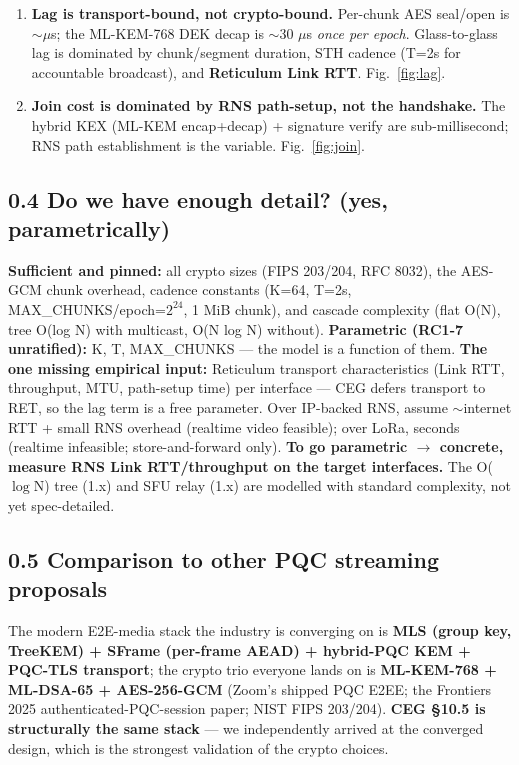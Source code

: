 \documentclass[10pt]{article}
\begin{document}
\begin{enumerate}
{both caught in review, both kept on record per the \S1.4 honesty discipline.)}
Fig.~\ref{fig:cascade}.
\item \textbf{Lag is transport-bound, not crypto-bound.} Per-chunk AES seal/open
is $\sim$$\mu$s; the ML-KEM-768 DEK decap is $\sim$30 $\mu$s \emph{once per epoch}.
Glass-to-glass lag is dominated by chunk/segment duration, STH cadence (T=2s for
accountable broadcast), and \textbf{Reticulum Link RTT}. Fig.~\ref{fig:lag}.
\item \textbf{Join cost is dominated by RNS path-setup, not the handshake.} The
hybrid KEX (ML-KEM encap+decap) + signature verify are sub-millisecond; RNS path
establishment is the variable. Fig.~\ref{fig:join}.
\end{enumerate}

\subsection*{0.4 Do we have enough detail? (yes, parametrically)}
\textbf{Sufficient and pinned:} all crypto sizes (FIPS 203/204, RFC 8032), the
AES-GCM chunk overhead, cadence constants (K=64, T=2s, MAX\_CHUNKS/epoch=$2^{24}$,
1 MiB chunk), and cascade complexity (flat O(N), tree O(log N) with multicast, O(N log N) without).
\textbf{Parametric (RC1-7 unratified):} K, T, MAX\_CHUNKS --- the model is a
function of them. \textbf{The one missing empirical input:} Reticulum transport
characteristics (Link RTT, throughput, MTU, path-setup time) per interface ---
CEG defers transport to RET, so the lag term is a free parameter. Over IP-backed
RNS, assume $\sim$internet RTT + small RNS overhead (realtime video feasible);
over LoRa, seconds (realtime infeasible; store-and-forward only). \textbf{To go
parametric $\rightarrow$ concrete, measure RNS Link RTT/throughput on the target
interfaces.} The O($\log$N) tree (1.x) and SFU relay (1.x) are modelled with
standard complexity, not yet spec-detailed.

\subsection*{0.5 Comparison to other PQC streaming proposals}
The modern E2E-media stack the industry is converging on is \textbf{MLS (group key,
TreeKEM) + SFrame (per-frame AEAD) + hybrid-PQC KEM + PQC-TLS transport}; the
crypto trio everyone lands on is \textbf{ML-KEM-768 + ML-DSA-65 + AES-256-GCM}
(Zoom's shipped PQC E2EE; the Frontiers 2025 authenticated-PQC-session paper;
NIST FIPS 203/204). \textbf{CEG \S10.5 is structurally the same stack} --- we
independently arrived at the converged design, which is the strongest validation
of the crypto choices.
\end{document}
